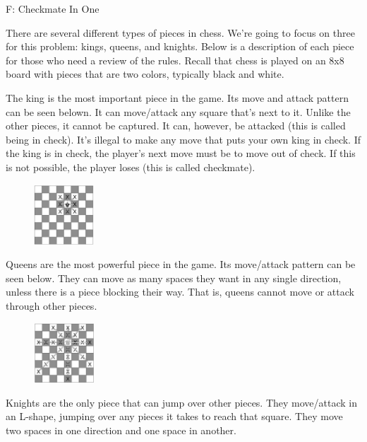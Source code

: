 \begin{problem}{F: Checkmate In One}

There are several different types of pieces in chess. We're going to focus on three for this problem: kings, queens, and knights. Below is a description of each piece for those who need a review of the rules. Recall that chess is played on an 8x8 board with pieces that are two colors, typically black and white.

The king is the most important piece in the game. Its move and attack pattern can be seen belown. It can move/attack any square that's next to it. Unlike the other pieces, it cannot be captured. It can, however, be attacked (this is called being in check). It's illegal to make any move that puts your own king in check. If the king is in check, the player's next move must be to move out of check. If this is not possible, the player loses (this is called checkmate).

\begin{figure}[h]
    \centering
    \includegraphics[width=0.2\textwidth]{king-moves.eps}
\end{figure}

Queens are the most powerful piece in the game. Its move/attack pattern can be seen below. They can move as many spaces they want in any single direction, unless there is a piece blocking their way. That is, queens cannot move or attack through other pieces.

\begin{figure}[h]
    \centering
    \includegraphics[width=0.2\textwidth]{queen-moves.eps}
\end{figure}

Knights are the only piece that can jump over other pieces. They move/attack in an L-shape, jumping over any pieces it takes to reach that square. They move two spaces in one direction and one space in another.


\end{problem}

